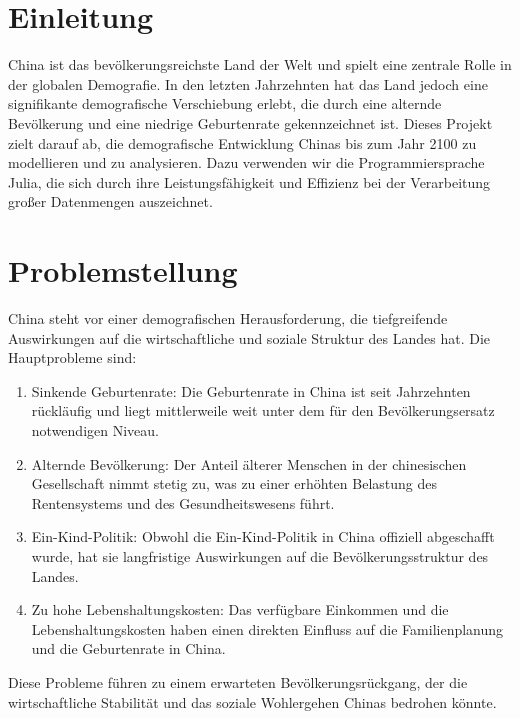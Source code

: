 
\section{Einleitung}
China ist das bevölkerungsreichste Land der Welt und spielt eine zentrale Rolle in der globalen Demografie. In den letzten Jahrzehnten hat das Land jedoch eine signifikante demografische Verschiebung erlebt, die durch eine alternde Bevölkerung und eine niedrige Geburtenrate gekennzeichnet ist. Dieses Projekt zielt darauf ab, die demografische Entwicklung Chinas bis zum Jahr 2100 zu modellieren und zu analysieren. Dazu verwenden wir die Programmiersprache Julia, die sich durch ihre Leistungsfähigkeit und Effizienz bei der Verarbeitung großer Datenmengen auszeichnet.
\\

\section{Problemstellung}

China steht vor einer demografischen Herausforderung, die tiefgreifende Auswirkungen auf die wirtschaftliche und soziale Struktur des Landes hat. Die Hauptprobleme sind:


\begin{enumerate}
\item Sinkende Geburtenrate: Die Geburtenrate in China ist seit Jahrzehnten rückläufig und liegt mittlerweile weit unter dem für den Bevölkerungsersatz notwendigen Niveau.
\item Alternde Bevölkerung: Der Anteil älterer Menschen in der chinesischen Gesellschaft nimmt stetig zu, was zu einer erhöhten Belastung des Rentensystems und des Gesundheitswesens führt.
\item Ein-Kind-Politik: Obwohl die Ein-Kind-Politik in China offiziell abgeschafft wurde, hat sie langfristige Auswirkungen auf die Bevölkerungsstruktur des Landes.
\item Zu hohe Lebenshaltungskosten: Das verfügbare Einkommen und die Lebenshaltungskosten haben einen direkten Einfluss auf die Familienplanung und die Geburtenrate in China.
\end{enumerate}
Diese Probleme führen zu einem erwarteten Bevölkerungsrückgang, der die wirtschaftliche Stabilität und das soziale Wohlergehen Chinas bedrohen könnte.

